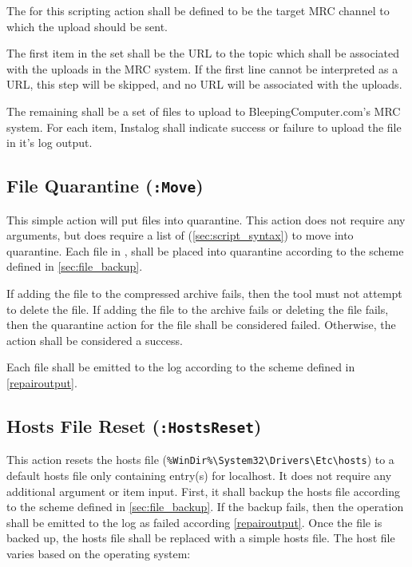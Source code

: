 The  for this scripting action shall be defined to be the target MRC
channel to which the upload should be sent.

The first item in the set  shall be the URL to the topic which shall
be associated with the uploads in the MRC system. If the first line cannot be
interpreted as a URL, this step will be skipped, and no URL will be associated
with the uploads.

The remaining  shall be a set of files to upload to
BleepingComputer.com's MRC system. For each item, Instalog shall indicate
success or failure to upload the file in it's log output.

\subsection{File Quarantine (\texttt{:Move})} \label{quarantine}
This simple action will put files into quarantine.  This action does not require
any arguments, but does require a list of  (\ref{sec:script_syntax})
to move into quarantine.  Each file in , shall be placed into
quarantine according to the scheme defined in \ref{sec:file_backup}.

If adding the file to the compressed archive fails, then the tool must not
attempt to delete the file.  If adding the file to the archive fails or deleting
the file fails, then the quarantine action for the file shall be considered
failed.  Otherwise, the action shall be considered a success.  

Each file shall be emitted to the log according to the scheme defined in
\ref{repairoutput}.

\subsection{Hosts File Reset (\texttt{:HostsReset})}
This action resets the hosts file (\verb|%WinDir%\System32\Drivers\Etc\hosts|)
to a default hosts file only containing entry(s) for localhost.  It does not
require any additional argument or item input. First, it shall backup the hosts
file according to the scheme defined in \ref{sec:file_backup}.  If the backup
fails, then the operation shall be emitted to the log as failed according
\ref{repairoutput}. Once the file is backed up, the hosts file shall be replaced
with a simple hosts file.  The host file varies based on the operating system:

